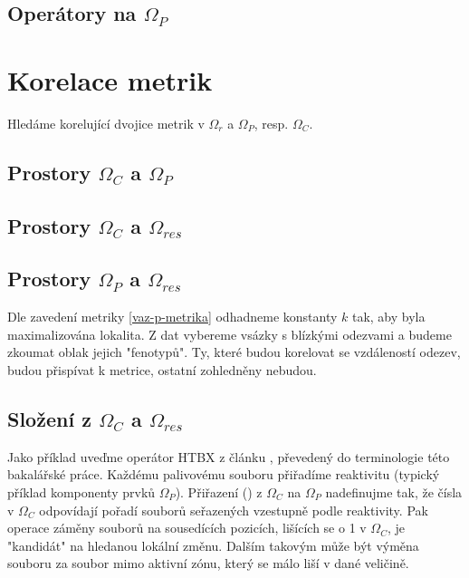 \subsection{Operátory na $\Omega_P$}

\section{Korelace metrik}
Hledáme korelující dvojice metrik v $\Omega_r$ a $\Omega_P$, resp. $\Omega_C$.  


\subsection{Prostory $\Omega_C$ a $\Omega_P$}



\subsection{Prostory $\Omega_C$ a $\Omega_{res}$}

\subsection{Prostory $\Omega_P$ a $\Omega_{res}$}
Dle zavedení metriky \eqref{vaz-p-metrika} odhadneme konstanty $k$ tak, aby byla maximalizována lokalita. Z dat vybereme vsázky s blízkými odezvami 
a budeme zkoumat oblak jejich "fenotypů". Ty, které budou korelovat se vzdáleností odezev, budou přispívat k metrice, ostatní zohledněny nebudou.



\subsection{Složení z $\Omega_C$ a $\Omega_{res}$}
Jako příklad uveďme operátor HTBX z článku \cite{parks}, převedený do terminologie této bakalářské práce. Každému palivovému souboru přiřadíme reaktivitu (typický příklad komponenty prvků $\Omega_P$). Přiřazení () z $\Omega_C$ na $\Omega_P$ nadefinujme tak, že čísla v $\Omega_C$ odpovídají pořadí souborů seřazených vzestupně podle reaktivity. Pak operace záměny souborů na 
sousedících pozicích, lišících se o 1 v $\Omega_C$, je "kandidát" na hledanou lokální změnu. Dalším takovým může být výměna souboru za soubor mimo aktivní zónu, který se málo liší v dané veličině.

